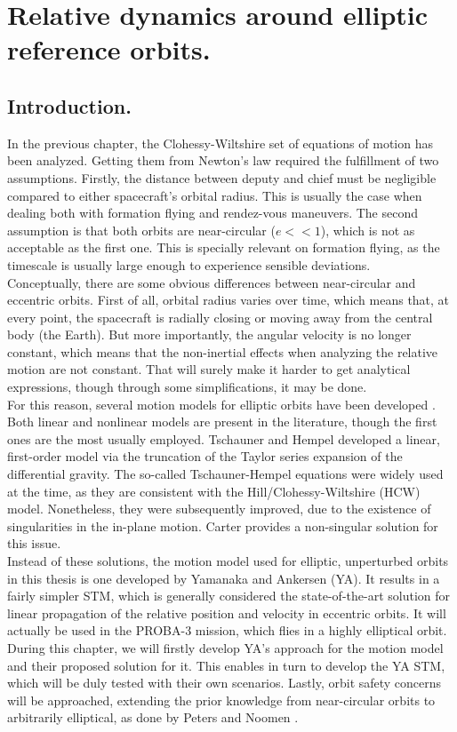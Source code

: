 \chapter{Relative dynamics around elliptic reference orbits.}
%
\label{chap: Eccentric}
%
\section{Introduction.}
%
\indent In the previous chapter, the Clohessy-Wiltshire set of equations of motion has been analyzed. Getting them from Newton's law required the fulfillment of two assumptions. Firstly, the distance between deputy and chief must be negligible compared to either spacecraft's orbital radius. This is usually the case when dealing both with formation flying and rendez-vous maneuvers. The second assumption is that both orbits are near-circular ($e<<1$), which is not as acceptable as the first one. This is specially relevant on formation flying, as the timescale is usually large enough to experience sensible deviations. \\
%
\indent Conceptually, there are some obvious differences between near-circular and eccentric orbits. First of all, orbital radius varies over time, which means that, at every point, the spacecraft is radially closing or moving away from the central body (\ie the Earth). But more importantly, the angular velocity is no longer constant, which means that the non-inertial effects when analyzing the relative motion are not constant. That will surely make it harder to get analytical expressions, though through some simplifications, it may be done.\\
%
\indent For this reason, several motion models for elliptic orbits have been developed \cite{Sullivan}. Both linear and nonlinear models are present in the literature, though the first ones are the most usually employed. Tschauner and Hempel \cite{Tschauner_Hempel} developed a linear, first-order model via the truncation of the Taylor series expansion of the differential gravity. The so-called Tschauner-Hempel equations were widely used at the time, as they are consistent with the Hill/Clohessy-Wiltshire (HCW) model. Nonetheless, they were subsequently improved, due to the existence of singularities in the in-plane motion. Carter \cite{Carter} provides a non-singular solution for this issue. \\
%
\indent Instead of these solutions, the motion model used for elliptic, unperturbed orbits in this thesis is one developed by Yamanaka and Ankersen \cite{Yamanaka_ankersen} (YA). It results in a fairly simpler STM, which is generally considered the state-of-the-art solution for linear propagation of the relative position and velocity in eccentric orbits. It will actually be used in the PROBA-3 mission, which flies in a highly elliptical orbit.\\
%
\indent During this chapter, we will firstly develop YA's approach for the motion model and their proposed solution for it. This enables in turn to develop the YA STM, which will be duly tested with their own scenarios. Lastly, orbit safety concerns will be approached, extending the prior knowledge from near-circular orbits to arbitrarily elliptical, as done by Peters and Noomen \cite{Peters_Noomen}.
%
